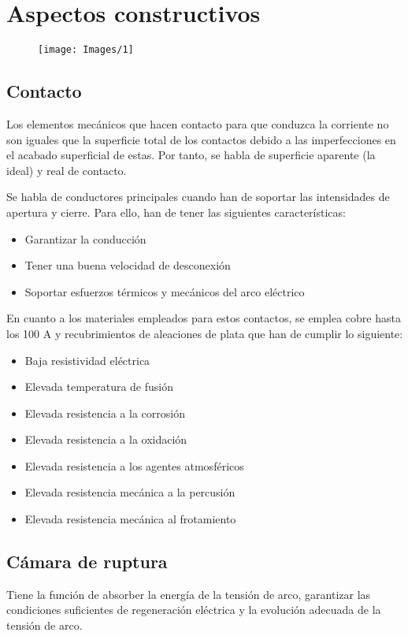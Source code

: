 \section{Aspectos constructivos}
\begin{figure}[H]
	\centering
	\texttt{[image: Images/1]}
	\label{fig:1}
\end{figure}

\subsection{Contacto}
Los elementos mecánicos que hacen contacto para que conduzca la corriente no son iguales que la superficie total de los contactos debido a las imperfecciones en el acabado superficial de estas. Por tanto, se habla de superficie aparente (la ideal) y real de contacto.
\newline

Se habla de conductores principales cuando han de soportar las intensidades de apertura y cierre. Para ello, han de tener las siguientes características:
\begin{itemize}
	\item Garantizar la conducción
	\item Tener una buena velocidad de desconexión
	\item Soportar esfuerzos térmicos y mecánicos del arco eléctrico
\end{itemize}

En cuanto a los materiales empleados para estos contactos, se emplea cobre hasta los 100 A y recubrimientos de aleaciones de plata que han de cumplir lo siguiente:
\begin{itemize}
	\item Baja resistividad eléctrica
	\item	Elevada temperatura de fusión
	\item Elevada resistencia a la corrosión
	\item Elevada resistencia a la oxidación
	\item Elevada resistencia a los agentes atmosféricos
	\item Elevada resistencia mecánica a la percusión
	\item Elevada resistencia mecánica al frotamiento
\end{itemize}
\subsection{Cámara de ruptura}
Tiene la función de absorber la energía de la tensión de arco, garantizar las condiciones suficientes de regeneración eléctrica y la evolución adecuada de la tensión de arco.

